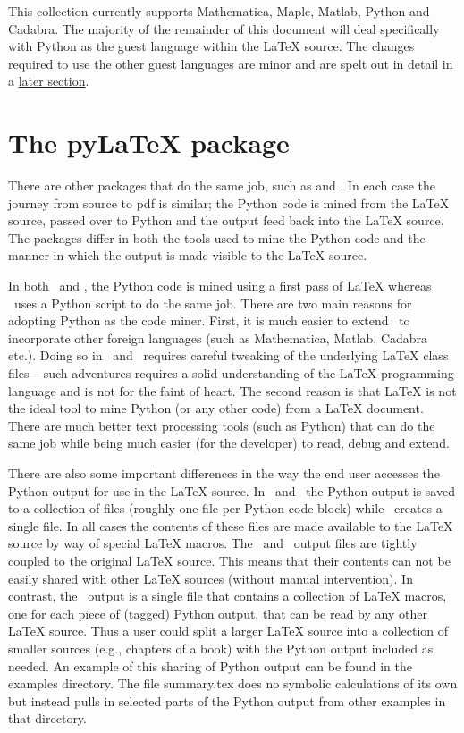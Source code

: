 \documentclass[12pt]{article}
\begin{document}
This collection currently supports Mathematica, Maple, Matlab, Python and Cadabra.
The majority of the remainder of this document will deal specifically with Python
as the guest language within the LaTeX source. The changes required to use the
other guest languages are minor and are spelt out in detail in a
\hyperlink{sec:other-lang}{later section}.

\section{The pyLaTeX package}

There are other packages that do the same job, such as
\href{https://github.com/gpoore/pythontex}{\PythonTeX} and
\href{https://github.com/sagemath/sagetex}{\SageTeX}. In each case the journey from
source to pdf is similar; the Python code is mined from the LaTeX source, passed
over to Python and the output feed back into the LaTeX source. The packages differ
in both the tools used to mine the Python code and the manner in which the output
is made visible to the LaTeX source.

In both \PythonTeX\ and \SageTeX, the Python code is mined using a first pass of
LaTeX whereas \pyLaTeX\ uses a Python script to do the same job. There are two main
reasons for adopting Python as the code miner. First, it is much easier to extend
\pyLaTeX\ to incorporate other foreign languages (such as Mathematica, Matlab,
Cadabra etc.). Doing so in \PythonTeX\ and \SageTeX\ requires careful tweaking of
the underlying LaTeX class files -- such adventures requires a solid understanding
of the LaTeX programming language and is not for the faint of heart. The second
reason is that LaTeX is not the ideal tool to mine Python (or any other code) from
a LaTeX document. There are much better text processing tools (such as Python) that
can do the same job while being much easier (for the developer) to read, debug and
extend.

There are also some important differences in the way the end user accesses the
Python output for use in the LaTeX source. In \PythonTeX\ and \SageTeX\ the Python
output is saved to a collection of files (roughly one file per Python code block)
while \pyLaTeX\ creates a single file. In all cases the contents of these files are
made available to the LaTeX source by way of special LaTeX macros. The \PythonTeX\
and \SageTeX\ output files are tightly coupled to the original LaTeX source. This
means that their contents can not be easily shared with other LaTeX sources
(without manual intervention). In contrast, the \pyLaTeX\ output is a single file
that contains a collection of LaTeX macros, one for each piece of (tagged) Python
output, that can be read by any other LaTeX source. Thus a user could split a
larger LaTeX source into a collection of smaller sources (e.g., chapters of a book)
with the Python output included as needed. An example of this sharing of Python
output can be found in the examples directory. The file {\tts summary.tex} does no
symbolic calculations of its own but instead pulls in selected parts of the Python
output from other examples in that directory.
\end{document}
